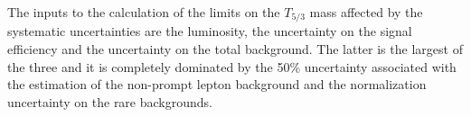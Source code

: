 The inputs to the calculation of the limits on the $T_{5/3}$ mass affected by the systematic uncertainties are the luminosity, the uncertainty on the signal efficiency 
and the uncertainty on the total background. The latter is the largest of
the three and it is completely dominated by the 50\% uncertainty associated with the estimation of the 
non-prompt lepton background and the normalization uncertainty on the rare backgrounds.


